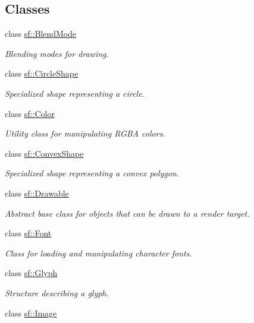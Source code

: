 \subsection*{Classes}
\begin{DoxyCompactItemize}
\item 
class \hyperlink{structsf_1_1BlendMode}{sf\+::\+Blend\+Mode}
\begin{DoxyCompactList}\small\item\em Blending modes for drawing. \end{DoxyCompactList}\item 
class \hyperlink{classsf_1_1CircleShape}{sf\+::\+Circle\+Shape}
\begin{DoxyCompactList}\small\item\em Specialized shape representing a circle. \end{DoxyCompactList}\item 
class \hyperlink{classsf_1_1Color}{sf\+::\+Color}
\begin{DoxyCompactList}\small\item\em Utility class for manipulating R\+G\+BA colors. \end{DoxyCompactList}\item 
class \hyperlink{classsf_1_1ConvexShape}{sf\+::\+Convex\+Shape}
\begin{DoxyCompactList}\small\item\em Specialized shape representing a convex polygon. \end{DoxyCompactList}\item 
class \hyperlink{classsf_1_1Drawable}{sf\+::\+Drawable}
\begin{DoxyCompactList}\small\item\em Abstract base class for objects that can be drawn to a render target. \end{DoxyCompactList}\item 
class \hyperlink{classsf_1_1Font}{sf\+::\+Font}
\begin{DoxyCompactList}\small\item\em Class for loading and manipulating character fonts. \end{DoxyCompactList}\item 
class \hyperlink{classsf_1_1Glyph}{sf\+::\+Glyph}
\begin{DoxyCompactList}\small\item\em Structure describing a glyph. \end{DoxyCompactList}\item 
class \hyperlink{classsf_1_1Image}{sf\+::\+Image}

\end{DoxyCompactItemize}

